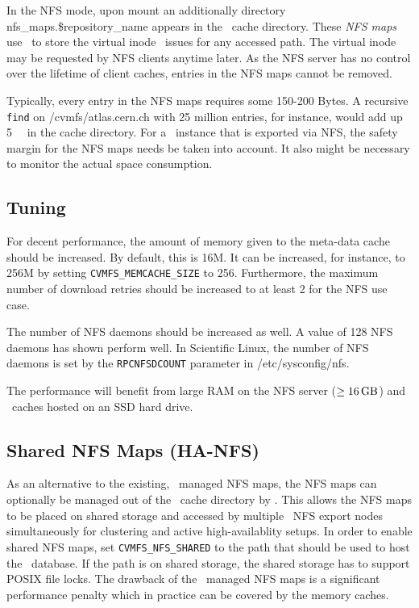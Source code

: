 In the NFS mode, upon mount an additionally directory nfs\_maps.\$repository\_name appears in the \cvmfs\ cache directory.
These \emph{NFS maps} use \leveldb\ to store the virtual inode \cvmfs\ issues for any accessed path.
The virtual inode may be requested by NFS clients anytime later.
As the NFS server has no control over the lifetime of client caches, entries in the NFS maps cannot be removed.

Typically, every entry in the NFS maps requires some 150-200 Bytes. 
A recursive \texttt{find} on /cvmfs/atlas.cern.ch with 25 million entries, for instance, would add up \SI{5}{\giga\byte} in the cache directory. 
For a \cvmfs\ instance that is exported via NFS, the safety margin for the NFS maps needs be taken into account.
It also might be necessary to monitor the actual space consumption.

\subsection{Tuning}
For decent performance, the amount of memory given to the meta-data cache should be increased. 
By default, this is 16M.
It can be increased, for instance, to 256M by setting \texttt{CVMFS\_MEMCACHE\_SIZE} to 256.
Furthermore, the maximum number of download retries should be increased to at least 2 for the NFS use case.

The number of NFS daemons should be increased as well.
A value of 128 NFS daemons has shown perform well.
In Scientific Linux, the number of NFS daemons is set by the \texttt{RPCNFSDCOUNT} parameter in /etc/sysconfig/nfs.

The performance will benefit from large RAM on the NFS server ($\geq\SI{16}{\giga\byte}$) and \cvmfs\ caches hosted on an SSD hard drive.

\subsection{Shared NFS Maps (HA-NFS)}
As an alternative to the existing, \leveldb\ managed NFS maps, the NFS maps can optionally be managed out of the \cvmfs\ cache directory by \sqlite.
This allows the NFS maps to be placed on shared storage and accessed by multiple \cvmfs\ NFS export nodes simultaneously for clustering and active high-availablity setups.
In order to enable shared NFS maps, set \texttt{CVMFS\_NFS\_SHARED} to the path that should be used to host the \sqlite\ database.  
If the path is on shared storage, the shared storage has to support POSIX file locks.
The drawback of the \sqlite\ managed NFS maps is a significant performance penalty which in practice can be covered by the memory caches.

